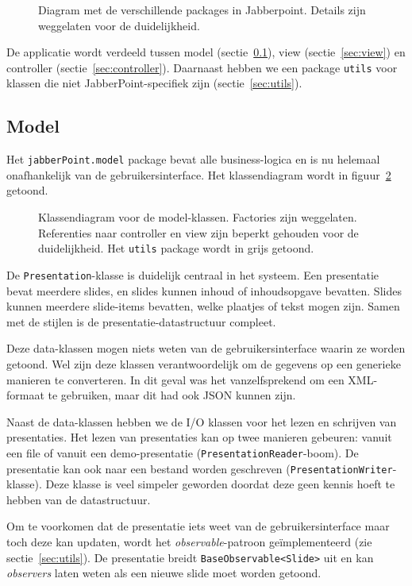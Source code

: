 \documentclass[a4paper]{article}
\newcommand{\code}[1]{\lstinline[columns=fixed]{#1}}
\newcommand{\diagram}[3][1.3]{
	\begin{figure}[!htb]
	 \caption{#3}
	 \label{diagram:#2}
	 \makebox[\textwidth][c]{\texttt{[image: Diagrams/\#2.pdf]}}%
	\end{figure}
}
\begin{document}
		\diagram{jabberPoint-packages}{
			Diagram met de verschillende packages in Jabberpoint.
			Details zijn weggelaten voor de duidelijkheid.
		}
		
		De applicatie wordt verdeeld tussen model (sectie~\ref{sec:model}), view (sectie~\ref{sec:view}) en controller (sectie~\ref{sec:controller}).
		Daarnaast hebben we een package \code{utils} voor klassen die niet JabberPoint-specifiek zijn (sectie~\ref{sec:utils}).

	\subsection{Model}\label{sec:model}
		Het \code{jabberPoint.model} package bevat alle business-logica en is nu helemaal onafhankelijk van de gebruikersinterface.
		Het klassendiagram wordt in figuur~\ref{diagram:model} getoond.

		\diagram{model}{
			Klassendiagram voor de model-klassen.
			Factories zijn weggelaten.
			Referenties naar controller en view zijn beperkt gehouden voor de duidelijkheid.
			Het \code{utils} package wordt in grijs getoond.
		}

		De \code{Presentation}-klasse is duidelijk centraal in het systeem.
		Een presentatie bevat meerdere slides, en slides kunnen inhoud of inhoudsopgave bevatten.
		Slides kunnen meerdere slide-items bevatten, welke plaatjes of tekst mogen zijn.
		Samen met de stijlen is de presentatie-datastructuur compleet.

		Deze data-klassen mogen niets weten van de gebruikersinterface waarin ze worden getoond.
		Wel zijn deze klassen verantwoordelijk om de gegevens op een generieke manieren te converteren.
		In dit geval was het vanzelfsprekend om een XML-formaat te gebruiken, maar dit had ook JSON kunnen zijn.

		Naast de data-klassen hebben we de I/O klassen voor het lezen en schrijven van presentaties.
		Het lezen van presentaties kan op twee manieren gebeuren: vanuit een file of vanuit een demo-presentatie (\code{PresentationReader}-boom).
		De presentatie kan ook naar een bestand worden geschreven (\code{PresentationWriter}-klasse).
		Deze klasse is veel simpeler geworden doordat deze geen kennis hoeft te hebben van de datastructuur.

		Om te voorkomen dat de presentatie iets weet van de gebruikersinterface maar toch deze kan updaten, wordt het \textit{observable}-patroon geïmplementeerd (zie sectie~\ref{sec:utils}).
		De presentatie breidt \code{BaseObservable<Slide>} uit en kan \textit{observers} laten weten als een nieuwe slide moet worden getoond.
\end{document}
